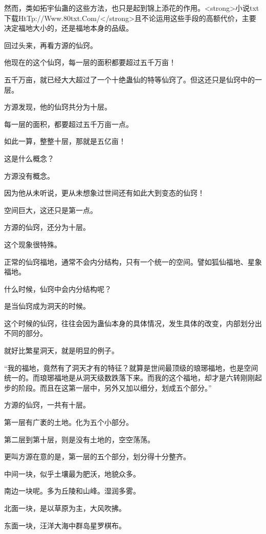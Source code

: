 
\begin{this_body}

然而，类如拓宇仙蛊的这些方法，也只是起到锦上添花的作用。<strong>小说txt下载HtTp://Www.80txt.Com/</strong>且不论运用这些手段的高额代价，主要决定福地大小的，还是福地本身的品级。

回过头来，再看方源的仙窍。

他现在的这个仙窍，每一层的面积都要超过五千万亩！

五千万亩，就已经大大超过了一个十绝蛊仙的特等仙窍了。但这还只是仙窍中的一层。

方源发现，他的仙窍共分为十层。

每一层的面积，都要超过五千万亩一点。

如此一算，整整十层，那就是五亿亩！

这是什么概念？

方源没有概念。

因为他从未听说，更从未想象过世间还有如此大到变态的仙窍！

空间巨大，这还只是第一点。

方源的仙窍，还分为十层。

这个现象很特殊。

正常的仙窍福地，通常不会内分结构，只有一个统一的空间。譬如狐仙福地、星象福地。

什么时候，仙窍中会内分结构呢？

是当仙窍成为洞天的时候。

这个时候的仙窍，往往会因为蛊仙本身的具体情况，发生具体的改变，内部划分出不同的部分。

就好比繁星洞天，就是明显的例子。

“我的福地，竟然有了洞天才有的特征？就算是世间最顶级的琅琊福地，也是空间统一的。而琅琊福地是从洞天级数跌落下来。而我的这个福地，却才是六转刚刚起步的阶段。而且在这第一层中，另外又加以细分，划成五个部分。”

方源的仙窍，一共有十层。

第一层有广袤的土地。化为五个小部分。

第二层到第十层，则是没有土地的，空空荡荡。

更叫方源在意的是，第一层的五个部分，划分得十分整齐。

中间一块，似乎土壤最为肥沃，地貌众多。

南边一块呢。多为丘陵和山峰。湿润多雾。

北面一块，是以草原为主，大风吹拂。

东面一块，汪洋大海中群岛星罗棋布。


\end{this_body}
